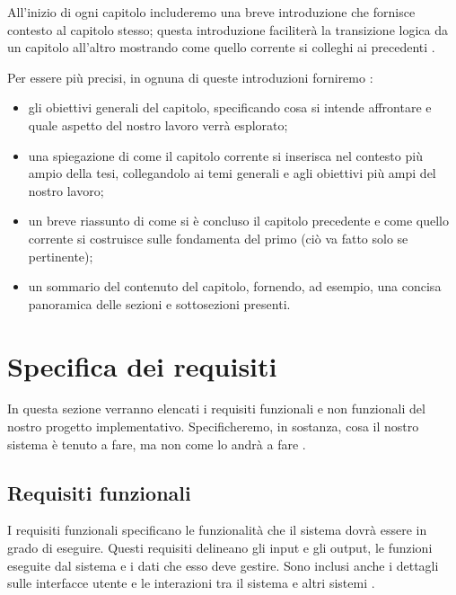 All'inizio di ogni capitolo includeremo una breve introduzione che fornisce contesto al capitolo stesso; questa introduzione faciliterà la transizione logica da un capitolo all'altro mostrando come quello corrente si colleghi ai precedenti \cite{zobel2015writing}.

\medskip

Per essere più precisi, in ognuna di queste introduzioni forniremo \cite{unibz2022thesis}:
\begin{itemize}

\item gli obiettivi generali del capitolo, specificando cosa si intende affrontare e quale aspetto del nostro lavoro verrà esplorato;

\item una spiegazione di come il capitolo corrente si inserisca nel contesto più ampio della tesi, collegandolo ai temi generali e agli obiettivi più ampi del nostro lavoro;

\item un breve riassunto di come si è concluso il capitolo precedente e come quello corrente si costruisce sulle fondamenta del primo (ciò va fatto solo se pertinente);

\item un sommario del contenuto del capitolo, fornendo, ad esempio, una concisa panoramica delle sezioni e sottosezioni presenti.

\end{itemize}

\section{Specifica dei requisiti}

In questa sezione verranno elencati i requisiti funzionali e non funzionali del nostro progetto implementativo. Specificheremo, in sostanza, cosa il nostro sistema è tenuto a fare, ma non come lo andrà a fare \cite{shoaff2001thesis}.

\subsection{Requisiti funzionali}

I requisiti funzionali specificano le funzionalità che il sistema dovrà essere in grado di eseguire. Questi requisiti delineano gli input e gli output, le funzioni eseguite dal sistema e i dati che esso deve gestire. Sono inclusi anche i dettagli sulle interfacce utente e le interazioni tra il sistema e altri sistemi \cite{wah2009pedia}.

